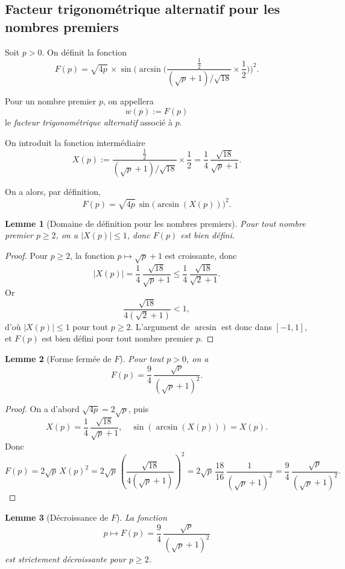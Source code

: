 \documentclass[12pt,a4paper]{article}
\newtheorem{lemma}{Lemme}
\begin{document}
\subsection{Facteur trigonométrique alternatif pour les nombres premiers}

Soit $p > 0$. On définit la fonction
\[
F(p)
= \sqrt{4p}\,\times
  \sin\!\Biggl(
    \arcsin\Biggl(
      \frac{\tfrac{1}{2}}{(\sqrt{p}+1)/\sqrt{18}} \times \frac{1}{2}
    \Biggr)
  \Biggr)^{2}.
\]

Pour un nombre premier $p$, on appellera
\[
w(p) := F(p)
\]
le \emph{facteur trigonométrique alternatif} associé à $p$.


On introduit la fonction intermédiaire
\[
X(p)
:= \frac{\tfrac{1}{2}}{(\sqrt{p}+1)/\sqrt{18}} \times \frac{1}{2}
= \frac{1}{4}\,\frac{\sqrt{18}}{\sqrt{p}+1}.
\]

On a alors, par définition,
\[
F(p) = \sqrt{4p}\,\sin\bigl(\arcsin(X(p))\bigr)^{2}.
\]

\begin{lemma}[Domaine de définition pour les nombres premiers]
Pour tout nombre premier $p \ge 2$, on a $|X(p)| \le 1$, donc $F(p)$ est bien défini.
\end{lemma}

\begin{proof}
Pour $p \ge 2$, la fonction $p \mapsto \sqrt{p}+1$ est croissante, donc
\[
|X(p)|
= \frac{1}{4}\,\frac{\sqrt{18}}{\sqrt{p}+1}
\le \frac{1}{4}\,\frac{\sqrt{18}}{\sqrt{2}+1}.
\]
Or
\[
\frac{\sqrt{18}}{4(\sqrt{2}+1)} < 1,
\]
d'où $|X(p)| \le 1$ pour tout $p \ge 2$. L'argument de $\arcsin$ est donc dans $[-1,1]$, et $F(p)$ est bien défini pour tout nombre premier $p$.
\end{proof}

\begin{lemma}[Forme fermée de $F$]
Pour tout $p > 0$, on a
\[
F(p)
= \frac{9}{4}\,\frac{\sqrt{p}}{(\sqrt{p}+1)^{2}}.
\]
\end{lemma}

\begin{proof}
On a d'abord $\sqrt{4p} = 2\sqrt{p}$, puis
\[
X(p)
= \frac{1}{4}\,\frac{\sqrt{18}}{\sqrt{p}+1},
\quad
\sin(\arcsin(X(p))) = X(p).
\]
Donc
\[
F(p)
= 2\sqrt{p}\,X(p)^{2}
= 2\sqrt{p}\,\left(\frac{\sqrt{18}}{4(\sqrt{p}+1)}\right)^{2}
= 2\sqrt{p}\,\frac{18}{16}\,\frac{1}{(\sqrt{p}+1)^{2}}
= \frac{9}{4}\,\frac{\sqrt{p}}{(\sqrt{p}+1)^{2}}.
\]
\end{proof}

\begin{lemma}[Décroissance de $F$]
La fonction
\[
p \mapsto F(p) = \frac{9}{4}\,\frac{\sqrt{p}}{(\sqrt{p}+1)^{2}}
\]
est strictement décroissante pour $p \ge 2$.
\end{lemma}
\end{document}
